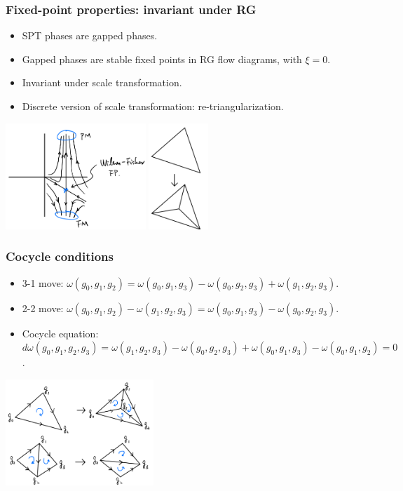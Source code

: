 \documentclass[xcolor=table, aspectratio=43,ignorenonframetext]{beamer}
\begin{document}
\begin{frame}
\frametitle{Fixed-point properties: invariant under RG}
\begin{itemize}
\item SPT phases are gapped phases.
\item Gapped phases are stable fixed points in RG flow diagrams, with $\xi=0$.
\item Invariant under scale transformation.
\item Discrete version of scale transformation: re-triangularization.
\end{itemize}

\begin{center}
	\includegraphics[height=4cm]{RGflow}
	\hspace{1cm}
	\includegraphics[height=4cm]{retri1}
\end{center}
\end{frame}

\begin{frame}
\frametitle{Cocycle conditions}
\begin{itemize}
	\item 3-1 move:
	$\omega(g_0,g_1,g_2) = \omega(g_0,g_1,g_3)
	-\omega(g_0,g_2,g_3) + \omega(g_1,g_2,g_3)$.
	\item 2-2 move:
	$\omega(g_0,g_1,g_2)-\omega(g_1, g_2,g_3)
	=\omega(g_0, g_1, g_3) - \omega(g_0, g_2, g_3)$.
	\item Cocycle equation:
	$d\omega(g_0,g_1,g_2,g_3)=\omega(g_1,g_2,g_3)
	-\omega(g_0,g_2,g_3)+\omega(g_0,g_1,g_3)-\omega(g_0,g_1,g_2)=0$.
\end{itemize}
\begin{center}
	\includegraphics[height=4cm]{moves}
\end{center}
\end{frame}
\end{document}
